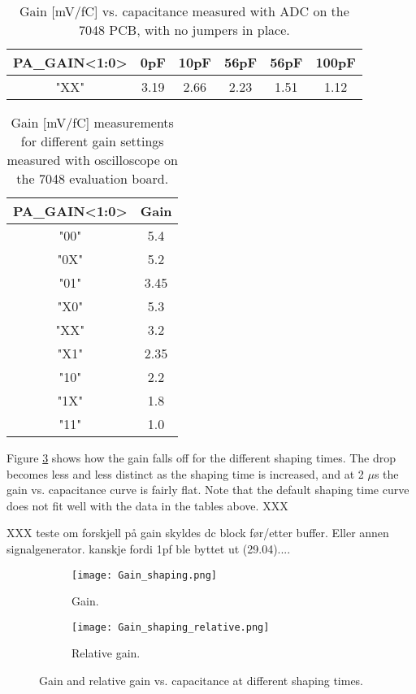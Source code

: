 \documentclass[../main/thesis.tex]{subfiles}
\begin{document}
\begin{table}[h!]
	\begin{center}
		\caption{Gain [mV/fC] vs. capacitance measured with ADC on the 7048 PCB, with no jumpers in place.}
		\label{tab-gain-adc-7048}
		\begin{tabular}{cccccc}\toprule
			\textbf{PA\_GAIN<1:0>} & \textbf{0pF}  & \textbf{10pF} & \textbf{56pF} & \textbf{56pF} & \textbf{100pF} \\ \midrule
			"XX"     & 3.19 & 2.66  & 2.23  & 1.51 & 1.12   \\ \bottomrule
		\end{tabular}
	\end{center}
\end{table}

\begin{table}[h!]
	\begin{center}
		\caption{Gain [mV/fC] measurements for different gain settings measured with oscilloscope on the 7048 evaluation board.}
		\label{tab-gains-7048}
		\begin{tabular}{cc}\toprule
			\textbf{PA\_GAIN<1:0>} & \textbf{Gain}   \\ \midrule
			"00" & 5.4  \\
			"0X" & 5.2  \\
			"01" & 3.45 \\
			"X0" & 5.3  \\
			"XX" & 3.2  \\
			"X1" & 2.35 \\
			"10" & 2.2  \\
			"1X" & 1.8  \\
			"11" & 1.0   \\ \bottomrule
		\end{tabular}
	\end{center}
\end{table}

Figure \ref{fig-IDE1180-gain} shows how the gain falls off for the different shaping times. The drop becomes less and less distinct as the shaping time is increased, and at 2 $\mu$s the gain vs. capacitance curve is fairly flat. Note that the default shaping time curve does not fit well with the data in the tables above. XXX

XXX teste om forskjell på gain skyldes dc block før/etter buffer. Eller annen signalgenerator. kanskje fordi 1pf ble byttet ut (29.04)....

\begin{figure}
	\centering
	\begin{subfigure}{.5\textwidth}
		\centering
		\texttt{[image: Gain\_shaping.png]}
		\caption{Gain.}
		\label{fig-IDE1180-gain-}
	\end{subfigure}%
	\begin{subfigure}{.5\textwidth}
		\centering
		\texttt{[image: Gain\_shaping\_relative.png]}
		\caption{Relative gain.}
		\label{fig-IDE1180-gain-rel} %
	\end{subfigure}
	\caption{Gain and relative gain vs. capacitance at different shaping times.}
	\label{fig-IDE1180-gain}
\end{figure}
\end{document}
